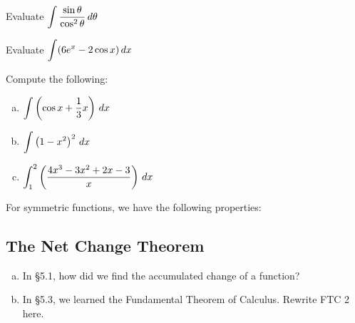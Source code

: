 \documentclass[notes]{subfiles}
\begin{document}
		\begin{ex}
			Evaluate \(\displaystyle \int \dfrac{\sin\theta}{\cos^2\theta}\,d\theta\)
		\end{ex}
			
		\begin{ex}
			Evaluate \(\displaystyle \int (6e^x-2\cos x)\, dx\)
		\end{ex}
			\newpage
			
		\begin{ex}
			Compute the following:
			\begin{enumerate}[(a)]
				\item  \(\displaystyle \int \left( \cos x + \dfrac{1}{3}x\right)\, dx\)
				\item \(\displaystyle \int \left( 1-x^2\right)^2\, dx\)
				\item \(\displaystyle \int_1^2 \left( \dfrac{4x^3 - 3x^2 + 2x -3}{x}\right)\, dx\)
			\end{enumerate}
		\end{ex}
	
		\begin{rmk}
			For symmetric functions, we have the following properties:\\

		\end{rmk}
			\newpage
			
	\subsection*{The Net Change Theorem}
		\begin{question}
			\begin{enumerate}[(a)]
				\item In \S5.1, how did we find the accumulated change of a function?  
					
				\item In \S5.3, we learned the Fundamental Theorem of Calculus.  Rewrite FTC 2 here.
			\end{enumerate}
		\end{question}
		
\end{document}
